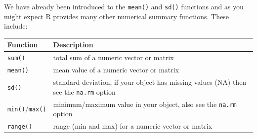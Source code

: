 \documentclass[a4paper]{book}
\begin{document}
We have already been introduced to the \texttt{mean()} and \texttt{sd()}
functions and as you might expect R provides many other numerical
summary functions. These include:

\begin{longtable}[]{@{}ll@{}}
\toprule
\begin{minipage}[b]{0.14\columnwidth}\raggedright\strut
Function\strut
\end{minipage} & \begin{minipage}[b]{0.80\columnwidth}\raggedright\strut
Description\strut
\end{minipage}\tabularnewline
\midrule
\endhead
\begin{minipage}[t]{0.14\columnwidth}\raggedright\strut
\texttt{sum()}\strut
\end{minipage} & \begin{minipage}[t]{0.80\columnwidth}\raggedright\strut
total sum of a numeric vector or matrix\strut
\end{minipage}\tabularnewline
\begin{minipage}[t]{0.14\columnwidth}\raggedright\strut
\texttt{mean()}\strut
\end{minipage} & \begin{minipage}[t]{0.80\columnwidth}\raggedright\strut
mean value of a numeric vector or matrix\strut
\end{minipage}\tabularnewline
\begin{minipage}[t]{0.14\columnwidth}\raggedright\strut
\texttt{sd()}\strut
\end{minipage} & \begin{minipage}[t]{0.80\columnwidth}\raggedright\strut
standard deviation, if your object has missing values (NA) then see the
\texttt{na.rm} option\strut
\end{minipage}\tabularnewline
\begin{minipage}[t]{0.14\columnwidth}\raggedright\strut
\texttt{min()}/\texttt{max()}\strut
\end{minipage} & \begin{minipage}[t]{0.80\columnwidth}\raggedright\strut
minimum/maximum value in your object, also see the \texttt{na.rm}
option\strut
\end{minipage}\tabularnewline
\begin{minipage}[t]{0.14\columnwidth}\raggedright\strut
\texttt{range()}\strut
\end{minipage} & \begin{minipage}[t]{0.80\columnwidth}\raggedright\strut
range (min and max) for a numeric vector or matrix\strut

\end{minipage}
\end{longtable}
\end{document}

